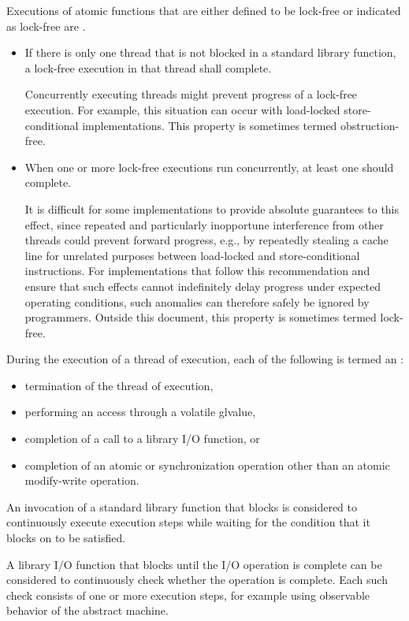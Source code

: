 \pnum
Executions of atomic functions
that are either defined to be lock-free
or indicated as lock-free
are .
\begin{itemize}
\item
  If there is only one thread that is not blocked
  in a standard library function,
  a lock-free execution in that thread shall complete.
  \begin{note}
    Concurrently executing threads
    might prevent progress of a lock-free execution.
    For example,
    this situation can occur
    with load-locked store-conditional implementations.
    This property is sometimes termed obstruction-free.
  \end{note}
\item
  When one or more lock-free executions run concurrently,
  at least one should complete.
  \begin{note}
    It is difficult for some implementations
    to provide absolute guarantees to this effect,
    since repeated and particularly inopportune interference
    from other threads
    could prevent forward progress,
    e.g.,
    by repeatedly stealing a cache line
    for unrelated purposes
    between load-locked and store-conditional instructions.
    For implementations that follow this recommendation and
    ensure that such effects cannot indefinitely delay progress
    under expected operating conditions,
    such anomalies
    can therefore safely be ignored by programmers.
    Outside this document,
    this property is sometimes termed lock-free.
  \end{note}
\end{itemize}

\pnum
During the execution of a thread of execution, each of the following is termed
an :
\begin{itemize}
\item termination of the thread of execution,
\item performing an access through a volatile glvalue,
\item completion of a call to a library I/O function, or
\item completion of an atomic or synchronization operation
other than an atomic modify-write operation.
\end{itemize}

\pnum
An invocation of a standard library function that blocks
is considered to continuously execute execution steps while waiting for the
condition that it blocks on to be satisfied.
\begin{example}
A library I/O function that blocks until the I/O operation is complete can
be considered to continuously check whether the operation is complete. Each
such check consists of one or more execution steps, for example using
observable behavior of the abstract machine.
\end{example}

